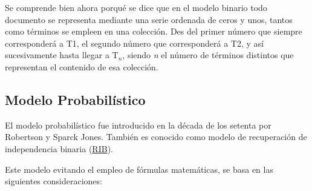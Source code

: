 \documentclass[titlepage]{article}
\begin{document}
	Se comprende bien ahora porqué se dice que en el modelo binario todo documento se representa mediante una serie ordenada de ceros y unos, tantos como términos se empleen en una colección. Des del primer número que siempre corresponderá a T1, el segundo número que corresponderá a T2, y así sucesivamente hasta llegar a T$_{n}$, siendo \textit{n} el número de términos distintos que representan el contenido de esa colección.
	
	\subsection{Modelo Probabilístico}
	
	El modelo probabilístico fue introducido en la década de los setenta por Robertson\cite{robertson} y Sparck Jones\cite{sparckjones}. También es conocido como modelo de recuperación de independencia binaria (\href{https://es.wikipedia.org/wiki/Modelo_de_independencia_binaria}{RIB}). 
	
	Este modelo evitando el empleo de fórmulas matemáticas, se basa en las siguientes consideraciones:
	
\end{document}
